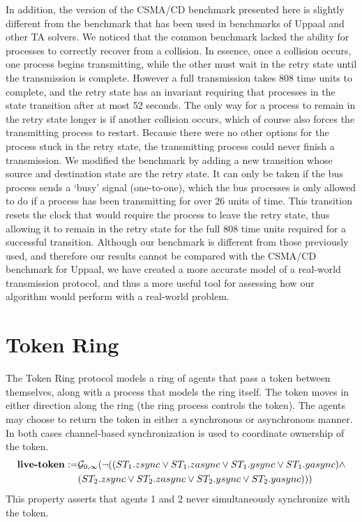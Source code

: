 \documentclass[a4paper,11pt]{report}
\theoremstyle{definition}
\begin{document}
In addition, the version of the CSMA/CD benchmark presented here is slightly
different from the benchmark that has been used in benchmarks of Uppaal and
other TA solvers. We noticed that the common benchmark lacked the ability for
processes to correctly recover from a collision. In essence, once a collision
occurs, one process begins transmitting, while the other must wait in the retry
state until the transmission is complete. However a full transmission takes 808
time units to complete, and the retry state has an invariant requiring that
processes in the state transition after at most 52 seconds. The only way for a
process to remain in the retry state longer is if another collision occurs,
which of course also forces the transmitting process to restart. Because there
were no other options for the process stuck in the retry state, the transmitting
process could never finish a transmission. We modified the benchmark by adding a
new transition whose source and destination state are the retry state. It can
only be taken if the bus process sends a `busy' signal (one-to-one), which the
bus processes is only allowed to do if a process has been transmitting for over
26 units of time. This transition resets the clock that would require the
process to leave the retry state, thus allowing it to remain in the retry state
for the full 808 time units required for a successful transition. Although our
benchmark is different from those previously used, and therefore our results
cannot be compared with the CSMA/CD benchmark for Uppaal, we have created a more
accurate model of a real-world transmission protocol, and thus a more useful
tool for assessing how our algorithm would perform with a real-world problem.

\section{Token Ring}\label{evaluation-token}

The Token Ring protocol models a ring of agents that pass a token between
themselves, along with a process that models the ring itself. The token moves in
either direction along the ring (the ring process controls the token). The
agents may choose to return the token in either a synchronous or asynchronous
manner. In both cases channel-based synchronization is used to coordinate
ownership of the token.
\begin{align*}
  \text{\textbf{live-token}} := & \mathcal{G}_{{0,\infty}} (\neg ((ST_{1}.zsync \lor ST_{1}.zasync \lor ST_{1}.ysync \lor ST_{1}.yasync) \land \\
  & (ST_{2}.zsync \lor ST_{2}.zasync \lor ST_{2}.ysync \lor ST_{2}.yasync))) \\
\end{align*}
This property asserts that agents 1 and 2 never simultaneously synchronize with
the token.
\end{document}

